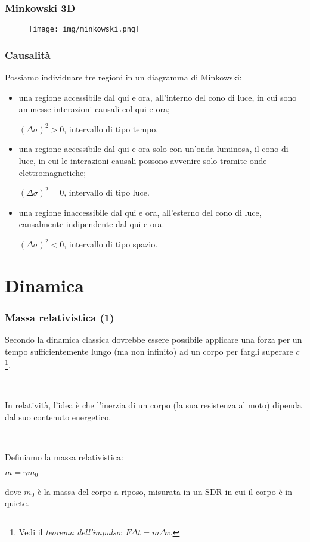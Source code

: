 \documentclass[]{beamer}
\theoremstyle{plain}
\begin{document}
\begin{frame}
\frametitle{Minkowski 3D}
\begin{figure}
\texttt{[image: img/minkowski.png]}
\end{figure}
\end{frame}


\begin{frame}
\frametitle{Causalità}
Possiamo individuare tre regioni in un diagramma di Minkowski:
\begin{itemize}
  \item una regione \alert<1>{accessibile dal qui e ora}, all'interno del cono di luce, in cui sono ammesse interazioni causali col qui e ora;\pause
  
\begin{center}
    \alert<2>{$ (\Delta \sigma)^2 > 0 $}, intervallo di tipo tempo.
  \end{center}\pause
  \item una regione \alert<3>{accessibile dal qui e ora solo con un'onda luminosa}, il cono di luce, in cui le interazioni causali possono avvenire solo tramite onde elettromagnetiche;\pause
  
\begin{center}
    \alert<4>{$ (\Delta \sigma)^2 = 0 $}, intervallo di tipo luce.
  \end{center}\pause
  \item una regione \alert<5>{inaccessibile dal qui e ora}, all'esterno del cono di luce, causalmente indipendente dal qui e ora.\pause
    
\begin{center}
    \alert<6>{$ (\Delta \sigma)^2 < 0 $}, intervallo di tipo spazio.
  \end{center}
\end{itemize}
\end{frame}

\section{Dinamica}

\begin{frame}
\frametitle{Massa relativistica (1)}
Secondo la dinamica classica dovrebbe essere possibile applicare una forza per un tempo sufficientemente lungo (ma non infinito) ad un corpo per fargli superare $ c $\footnote{Vedi il \emph{teorema dell'impulso}: $ F \Delta t = m \Delta v $.}.\pause

~

In relatività, l'idea è che l'inerzia di un corpo (la sua resistenza al moto) dipenda dal suo contenuto energetico.\pause

~

Definiamo la \alert{massa relativistica}:
\begin{center}
\colorbox{blue!30}{$ m = \gamma m_0 $}
\end{center}
dove $ m_0 $ è la massa del corpo a riposo, misurata in un SDR in cui il corpo è in quiete.
\end{frame}
\end{document}
